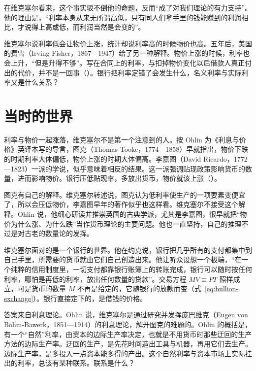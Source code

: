 在维克塞尔看来，这个事实驳不倒他的命题，反而“成了对我们理论的有力支持”\cite{wicksell1907}。他的理由是，“利率本身从来无所谓高低，只有同人们拿手里的钱能赚到的利润相比，才说得上高或低，而利润当然是会变的”\cite{wicksell1907}。

维克塞尔说利率低会让物价上涨，统计却说利率高的时候物价也高。五年后，美国的费雪（Irving Fisher，1867—1947）给了另一种解释。物价上涨的时候，利率也会上升，“但是升得不够”\cite{fisher1911}。写在合同上的利率，与扣掉物价变化以后借款人真正付出的代价，并不是一回事（）。银行把利率定错了会发生什么，名义利率与实际利率又是什么关系？

\section{当时的世界}\label{sec:wicksell-world}

利率与物价一起涨落，维克塞尔不是第一个注意到的人。按 Ohlin 为《利息与价格》英译本写的导言，图克（Thomas Tooke，1774—1858）早就指出，物价下跌的时期利率大体偏低，物价上涨的时期大体偏高\cite{wicksell1936}。李嘉图（David Ricardo，1772—1823）一派的学说，似乎意味着相反的结果\cite{wicksell1936}。这一派强调贴现政策影响货币的数量，进而影响物价。银行压低贴现率，多放出货币，物价就该上涨（）\cite{wicksell1936}。

图克有自己的解释。维克塞尔转述说，图克认为低利率使生产的一项要素变便宜了，所以会压低物价，李嘉图早年的著作似乎也这样看\cite{wicksell1907}。维克塞尔不接受这个解释。Ohlin 说，他细心研读并推崇英国的古典学派，尤其是李嘉图，很早就把“物价为什么涨、为什么跌”当作货币理论的主要问题\cite{wicksell1936}。他也一直坚持，自己的推理不过是对古老的数量论的发挥\cite{wicksell1936}。

维克塞尔面对的是一个银行的世界。他在约克说，银行把几乎所有的支付都集中到自己手里，所需要的货币就由它们自己创造出来\cite{wicksell1907}。他让听众设想一个极端，“在一个纯粹的信用制度里，一切支付都靠银行账簿上的转账完成，银行可以随时按任何利率，哪怕是再低的利率，放出任何数量的贷款”\cite{wicksell1907}。交易方程 $MV\equiv PT$ 照样成立，可是货币的数量 $M$ 不再是给定的，它随银行的放款而变（式~\eqref{eq:bullion-exchange}）。银行直接定下的，是借钱的价格。

答案来自利息理论。Ohlin 说，维克塞尔是通过研究并发挥庞巴维克（Eugen von Böhm-Bawerk，1851—1914）的利息理论，解开图克的难题的\cite{wicksell1936}。Ohlin 的概括是，有一个“自然”利率，由资本的边际生产率决定，也就是不用货币时那些迂回的生产方法的边际生产率\cite{wicksell1936}。迂回的生产，是先花时间造出工具与机器，再用它们去生产。边际生产率，是多投入一点资本能多得的产出。这个自然利率与资本市场上实际挂出的利率，总该有某种联系\cite{wicksell1936}。联系是什么？

